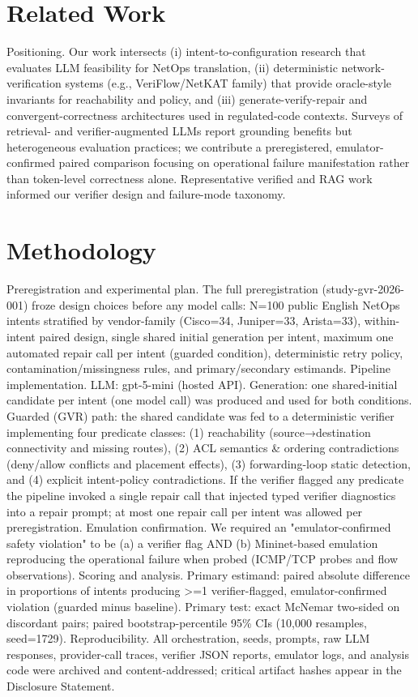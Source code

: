 \documentclass[conference]{IEEEtran}
\begin{document}
\section{Related Work}
Positioning. Our work intersects (i) intent-to-configuration research that evaluates LLM feasibility for NetOps translation, (ii) deterministic network-verification systems (e.g., VeriFlow/NetKAT family) that provide oracle-style invariants for reachability and policy, and (iii) generate-verify-repair and convergent-correctness architectures used in regulated-code contexts. Surveys of retrieval- and verifier-augmented LLMs report grounding benefits but heterogeneous evaluation practices; we contribute a preregistered, emulator-confirmed paired comparison focusing on operational failure manifestation rather than token-level correctness alone. Representative verified and RAG work informed our verifier design and failure-mode taxonomy.

\section{Methodology}
Preregistration and experimental plan. The full preregistration (study-gvr-2026-001) froze design choices before any model calls: N=100 public English NetOps intents stratified by vendor-family (Cisco=34, Juniper=33, Arista=33), within-intent paired design, single shared initial generation per intent, maximum one automated repair call per intent (guarded condition), deterministic retry policy, contamination/missingness rules, and primary/secondary estimands. Pipeline implementation. LLM: gpt-5-mini (hosted API). Generation: one shared-initial candidate per intent (one model call) was produced and used for both conditions. Guarded (GVR) path: the shared candidate was fed to a deterministic verifier implementing four predicate classes: (1) reachability (source→destination connectivity and missing routes), (2) ACL semantics \& ordering contradictions (deny/allow conflicts and placement effects), (3) forwarding-loop static detection, and (4) explicit intent-policy contradictions. If the verifier flagged any predicate the pipeline invoked a single repair call that injected typed verifier diagnostics into a repair prompt; at most one repair call per intent was allowed per preregistration. Emulation confirmation. We required an "emulator-confirmed safety violation" to be (a) a verifier flag AND (b) Mininet-based emulation reproducing the operational failure when probed (ICMP/TCP probes and flow observations). Scoring and analysis. Primary estimand: paired absolute difference in proportions of intents producing >=1 verifier-flagged, emulator-confirmed violation (guarded minus baseline). Primary test: exact McNemar two-sided on discordant pairs; paired bootstrap-percentile 95\% CIs (10,000 resamples, seed=1729). Reproducibility. All orchestration, seeds, prompts, raw LLM responses, provider-call traces, verifier JSON reports, emulator logs, and analysis code were archived and content-addressed; critical artifact hashes appear in the Disclosure Statement.
\end{document}
